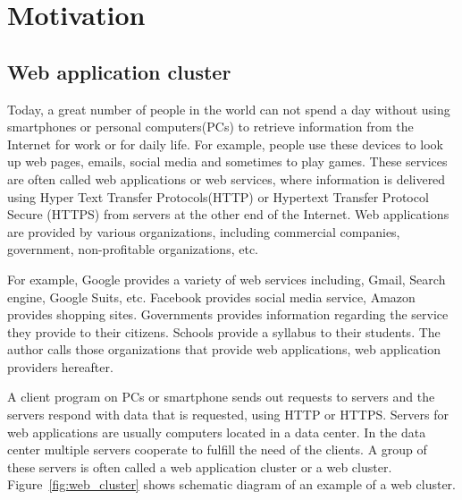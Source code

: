 
\section{Motivation}

\subsection{Web application cluster}

Today, a great number of people in the world can not spend a day without using smartphones or personal computers(PCs) to retrieve information from the Internet for work or for daily life.
For example, people use these devices to look up web pages, emails, social media and sometimes to play games.
These services are often called web applications or web services, where information is delivered using Hyper Text Transfer Protocols(HTTP) or Hypertext Transfer Protocol Secure (HTTPS) from servers at the other end of the Internet.
Web applications are provided by various organizations, including commercial companies, government, non-profitable organizations, etc.

For example, Google provides a variety of web services including, Gmail, Search engine, Google Suits, etc.
Facebook provides social media service, Amazon provides shopping sites.
Governments provides information regarding the service they provide to their citizens.
Schools provide a syllabus to their students.
The author calls those organizations that provide web applications, web application providers hereafter.

A client program on PCs or smartphone sends out requests to servers and the servers respond with data that is requested, using HTTP or HTTPS. 
Servers for web applications are usually computers located in a data center.
In the data center multiple servers cooperate to fulfill the need of the clients.
A group of these servers is often called a web application cluster or a web cluster.
Figure~\ref{fig:web_cluster} shows schematic diagram of an example of a web cluster.

